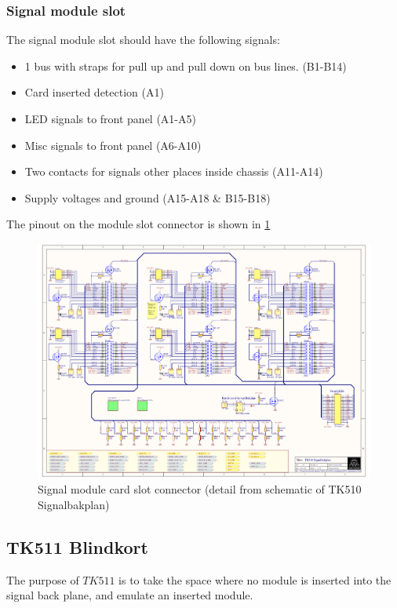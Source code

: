 \subsubsection{Signal module slot}
The signal module slot should have the following signals:
\begin{itemize}
    \item 1 bus with straps for pull up and pull down on bus lines. (B1-B14)
    \item Card inserted detection (A1)
    \item LED signals to front panel (A1-A5)
    \item Misc signals to front panel (A6-A10)
    \item Two contacts for signals other places inside chassis (A11-A14)
    \item Supply voltages and ground (A15-A18 \& B15-B18)
\end{itemize}
The pinout on the module slot connector is shown in \cref{fig:signalmodulslot}

\begin{figure}[h]
    \centering
    \includegraphics[trim={4.1cm 14.3cm 21.2cm 3.3cm},clip,width=\textwidth]{img/TK510_Signalbakplan.pdf}
    \caption{Signal module card slot connector (detail from schematic of TK510 Signalbakplan)}
    \label{fig:signalmodulslot}
\end{figure}

\subsection{TK511 Blindkort}
The purpose of $TK511$ is to take the space where no module is inserted into the signal back plane, and emulate an inserted module.

